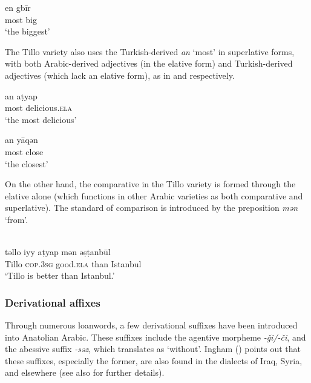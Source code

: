 \documentclass[output=paper]{langsci/langscibook}
\begin{document}
	\ex \label{adj2} \gll en gbīr  \\
        most big\\
        \glt `the biggest'
\z
\z

\noindent The Tillo variety also uses the Turkish-derived \textit{an} `most' in superlative forms, with both Arabic-derived adjectives (in the elative form) and Turkish-derived adjectives (which lack an elative form), as in  and  respectively.

\newpage
\ea \label{adjt}
		\ea \label{adjt1}\gll an\footnotemark	 {} aṭyap\\
    most	delicious.\textsc{ela} \\
        \glt `the most delicious'


	\ex \label{adjt2} \gll an 	yāqən  \\
        most	close\\
        \glt `the closest'
\z
\z
{}

\noindent  On the other hand, the comparative in the Tillo variety is formed through the elative alone (which functions in other Arabic varieties as both comparative and superlative). The standard of comparison is introduced by the preposition \textit{mən} `from'. 

\ea\label{adjt3} \\
\gll təllo 	iyy 		aṭyap mən 	ə\d{s}ṭanbūl\\  
     Tillo	\textsc{cop.3sg}	good.\textsc{ela}	than	Istanbul \\ 
\glt `Tillo is better than Istanbul.'
\z


\subsubsection{Derivational affixes}

Through numerous loanwords, a few derivational suffixes have been introduced into Anatolian Arabic. These suffixes include the agentive morpheme \textit{-\v{g}i/-\v{c}i}, and the abessive suffix \textit{-səz}, which translates as `without'. Ingham (\citeyear[178]{Ingham2011afg}) points out that these suffixes, especially the former, are also found in the dialects of Iraq, Syria, and elsewhere (see also \citealt{Procházka-Eisl2018} for further details).
\end{document}
